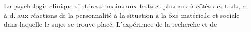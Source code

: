 La psychologie clinique s’intéresse moins
aux tests et plus aux à-côtés des tests, c. à d. aux réactions de la
personnalité à la situation à la fois matérielle et sociale dans
laquelle le sujet se trouve placé. L’expérience de la recherche et de
